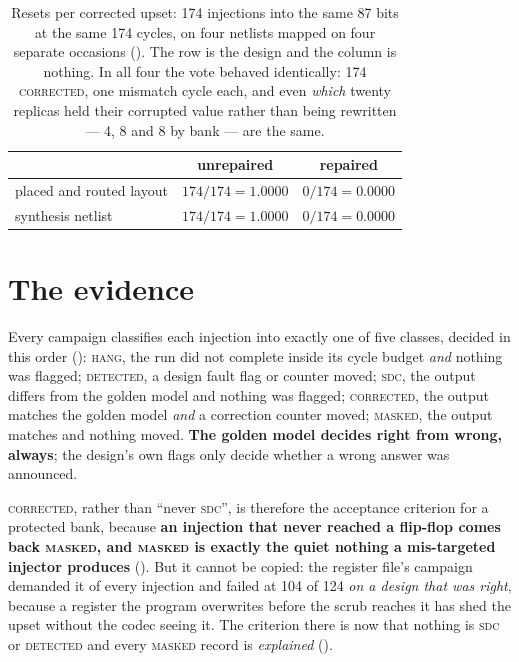 \begin{table}[tbp]
\centering
\small
\caption{Resets per corrected upset: 174 injections into the same 87
bits at the same 174 cycles, on four netlists mapped on four separate
occasions (). The row is the design and the
column is nothing. In all four the vote behaved identically: 174
\textsc{corrected}, one mismatch cycle each, and even \emph{which}
twenty replicas held their corrupted value rather than being rewritten
--- 4, 8 and 8 by bank --- are the same.}
\label{tab:w9}
\begin{tabular}{lcc}
\toprule
 & unrepaired & repaired \\
\midrule
placed and routed layout & $174/174 = 1.0000$ & $0/174 = 0.0000$ \\
synthesis netlist & $174/174 = 1.0000$ & $0/174 = 0.0000$ \\
\bottomrule
\end{tabular}
\end{table}

\section{The evidence}
\label{sec:harden-evidence}

Every campaign classifies each injection into exactly one of five
classes, decided in this order ():
\textsc{hang}, the run did not complete inside its cycle budget
\emph{and} nothing was flagged; \textsc{detected}, a design fault flag
or counter moved; \textsc{sdc}, the output differs from the golden model
and nothing was flagged; \textsc{corrected}, the output matches the
golden model \emph{and} a correction counter moved; \textsc{masked}, the
output matches and nothing moved. \textbf{The golden model decides right
from wrong, always}; the design's own flags only decide whether a wrong
answer was announced.

\textsc{corrected}, rather than ``never \textsc{sdc}'', is therefore the
acceptance criterion for a protected bank, because \textbf{an injection
that never reached a flip-flop comes back \textsc{masked}, and
\textsc{masked} is exactly the quiet nothing a mis-targeted injector
produces} (). But it cannot be copied: the
register file's campaign demanded it of every injection and failed at
104 of 124 \emph{on a design that was right}, because a register the
program overwrites before the scrub reaches it has shed the upset
without the codec seeing it. The criterion there is now that nothing is
\textsc{sdc} or \textsc{detected} and every \textsc{masked} record is
\emph{explained} ().


